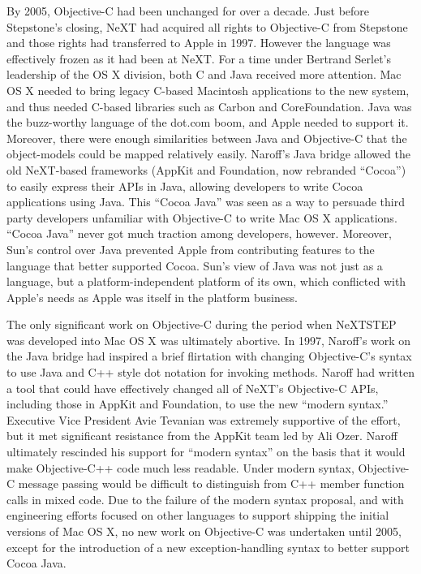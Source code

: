 \documentclass[acmsmall]{acmart}\settopmatter{}
\begin{document}
By 2005, Objective-C had been unchanged for over a decade. Just before Stepstone's closing, NeXT had acquired all rights to Objective-C from Stepstone and those rights had transferred to Apple in 1997. However the language was effectively frozen as it had been at NeXT. For a time under Bertrand Serlet's leadership of the OS X division, both C and Java received more attention. Mac OS X needed to bring legacy C-based Macintosh applications to the new system, and thus needed C-based libraries such as Carbon and CoreFoundation. Java was the buzz-worthy language of the dot.com boom, and Apple needed to support it. Moreover, there were enough similarities between Java and Objective-C that the object-models could be mapped relatively easily. Naroff's Java bridge allowed the old NeXT-based frameworks (AppKit and Foundation, now rebranded ``Cocoa'') to easily express their APIs in Java, allowing developers to write Cocoa applications using Java. This ``Cocoa Java'' was seen as a way to persuade third party developers unfamiliar with Objective-C to write Mac OS X applications. ``Cocoa Java'' never got much traction among developers, however. Moreover, Sun's control over Java prevented Apple from contributing features to the language that better supported Cocoa. Sun's view of Java was not just as a language, but a platform-independent platform of its own, which conflicted with Apple's needs as Apple was itself in the platform business.

The only significant work on Objective-C during the period when NeXTSTEP was developed into Mac OS X was ultimately abortive. In 1997, Naroff's work on the Java bridge had inspired a brief flirtation with changing Objective-C's syntax to use Java and C++ style dot notation for invoking methods. Naroff had written a tool that could have effectively changed all of NeXT's Objective-C APIs, including those in AppKit and Foundation, to use the new ``modern syntax.'' Executive Vice President Avie Tevanian was extremely supportive of the effort, but it met significant resistance from the AppKit team led by Ali Ozer. Naroff ultimately rescinded his support for ``modern syntax'' on the basis that it would make Objective-C++ code much less readable. Under modern syntax, Objective-C message passing would be difficult to distinguish from C++ member function calls in mixed code. Due to the failure of the modern syntax proposal, and with engineering efforts focused on other languages to support shipping the initial versions of Mac OS X, no new work on Objective-C was undertaken until 2005, except for the introduction of a new exception-handling syntax to better support Cocoa Java. 
\end{document}
